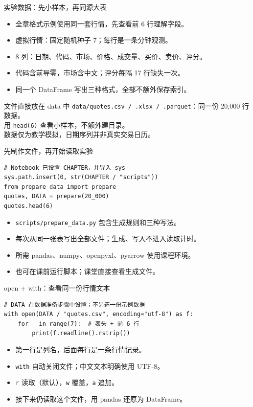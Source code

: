 \documentclass[9pt]{ctexbeamer}
\begin{document}
\begin{frame}{实验数据：先小样本，再同源大表}
\begin{itemize}
\item 全章格式示例使用同一套行情，先查看前 6 行理解字段。
\item 虚拟行情：固定随机种子 7；每行是一条分钟观测。
\item 8 列：日期、代码、市场、价格、成交量、买价、卖价、评分。
\item 代码含前导零，市场含中文；评分每隔 17 行缺失一次。
\item 同一个 DataFrame 写出三种格式，全部不额外保存索引。
\end{itemize}
\begin{block}{文件直接放在 data 中}
\texttt{data/quotes.csv / .xlsx / .parquet}：同一份 20,000 行数据。\\
用 \texttt{head(6)} 查看小样本，不额外建目录。\\
数据仅为教学模拟，日期序列并非真实交易日历。
\end{block}
\end{frame}

\begin{frame}[fragile]{先制作文件，再开始读取实验}
\begin{lstlisting}
# Notebook 已设置 CHAPTER，并导入 sys
sys.path.insert(0, str(CHAPTER / "scripts"))
from prepare_data import prepare
quotes, DATA = prepare(20_000)
quotes.head(6)
\end{lstlisting}
\begin{itemize}
\item \texttt{scripts/prepare\_data.py} 包含生成规则和三种写法。
\item 每次从同一张表写出全部文件；生成、写入不进入读取计时。
\item 所需 pandas、numpy、openpyxl、pyarrow 使用课程环境。
\item 也可在课前运行脚本；课堂直接查看生成文件。
\end{itemize}
\end{frame}

\begin{frame}[fragile]{open + with：查看同一份行情文本}
\begin{lstlisting}
# DATA 在数据准备步骤中设置；不另造一份示例数据
with open(DATA / "quotes.csv", encoding="utf-8") as f:
    for _ in range(7):  # 表头 + 前 6 行
        print(f.readline().rstrip())
\end{lstlisting}
\begin{itemize}
\item 第一行是列名，后面每行是一条行情记录。
\item \texttt{with} 自动关闭文件；中文文本明确使用 UTF-8。
\item \texttt{r} 读取（默认），\texttt{w} 覆盖，\texttt{a} 追加。
\item 接下来仍读取这个文件，用 pandas 还原为 DataFrame。
\end{itemize}
\end{frame}
\end{document}
